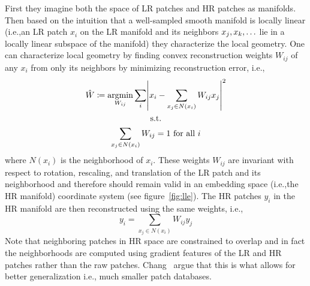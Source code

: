 %
First they imagine both the space of LR patches and HR patches as manifolds.
%
Then based on the intuition that a well-sampled smooth manifold is locally linear (i.e.,an LR patch \(x_i\) on the LR manifold and its neighbors \(x_j, x_k, \mathellipsis\) lie in a locally linear subspace of the manifold) they characterize the local geometry.
%
One can characterize local geometry by finding convex reconstruction weights \(W_{ij}\) of any \(x_i\) from only its neighbors by minimizing reconstruction error, i.e.,\begin{gather}
    \hat{W} \coloneqq \underset{W_{ij}}{\text{argmin}} \sum_i \abs{ x_i - \sum_{x_j \in N(x_i)} W_{ij} x_j  }^2 \nonumber \\
    \text{s.t.} \\
    \sum_{x_j \in N(x_i)} W_{ij} = 1 \text{ for all }i \nonumber
\end{gather}
where \(N(x_i)\) is the neighborhood of \(x_i\).
%
These weights \(W_{ij}\) are invariant with respect to rotation, rescaling, and translation of the LR patch and its neighborhood\cite{saul2000introduction} and therefore should remain valid in an embedding space (i.e.,the HR manifold) coordinate system (see figure~\ref{fig:lle}).
%
The HR patches \(y_i\) in the HR manifold are then reconstructed using the same weights, i.e.,
\begin{equation}
    y_i = \sum_{x_j \in N(x_i)} W_{ij} y_j
\end{equation}
%
Note that neighboring patches in HR space are constrained to overlap and in fact the neighborhoods are computed using gradient features of the LR and HR patches rather than the raw patches.
%
Chang \etal~argue that this is what allows for better generalization i.e., much smaller patch databases.

